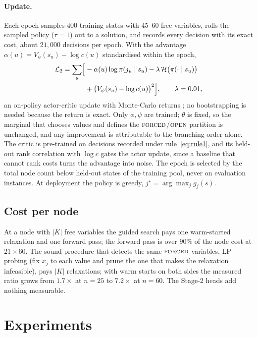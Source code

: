 \documentclass[final,5p,times,twocolumn,authoryear]{elsarticle}
\newcommand{\FORCED}{\textsc{forced}}
\newcommand{\FREE}{\textsc{open}}
\begin{document}
\paragraph{Update.} Each epoch samples $400$ training states with $45$--$60$ free variables, rolls the sampled policy ($\tau=1$) out to a solution, and records every decision with its exact cost, about $21{,}000$ decisions per epoch. With the advantage $\alpha(u)=V_\psi(s_u)-\log c(u)$ standardised within the epoch,
\begin{equation}
\begin{split}
\mathcal{L}_2=\sum_u\Bigl[&-\alpha(u)\log\pi(j_u\mid s_u)-\lambda\,\mathcal{H}\bigl(\pi(\cdot\mid s_u)\bigr)\\
&+\bigl(V_\psi(s_u)-\log c(u)\bigr)^2\Bigr],\qquad\lambda=0.01,
\end{split}
\label{eq:loss2}
\end{equation}
an on-policy actor-critic update with Monte-Carlo returns \citep{williams1992simple}; no bootstrapping is needed because the return is exact. Only $\phi,\psi$ are trained; $\theta$ is fixed, so the marginal that chooses values and defines the $\FORCED$/$\FREE$ partition is unchanged, and any improvement is attributable to the branching order alone. The critic is pre-trained on decisions recorded under rule~\eqref{eq:rule1}, and its held-out rank correlation with $\log c$ gates the actor update, since a baseline that cannot rank costs turns the advantage into noise. The epoch is selected by the total node count below held-out states of the training pool, never on evaluation instances. At deployment the policy is greedy, $j^\star=\arg\max_j g_j(s)$.

\subsection{Cost per node}
\label{sec:method-cost}

At a node with $|K|$ free variables the guided search pays one warm-started relaxation and one forward pass; the forward pass is over $90\%$ of the node cost at $21\times60$. The sound procedure that detects the same $\FORCED$ variables, LP-probing (fix $x_j$ to each value and prune the one that makes the relaxation infeasible), pays $|K|$ relaxations; with warm starts on both sides the measured ratio grows from $1.7\times$ at $n=25$ to $7.2\times$ at $n=60$. The Stage-2 heads add nothing measurable.

\section{Experiments}
\label{sec:exp}
\end{document}
